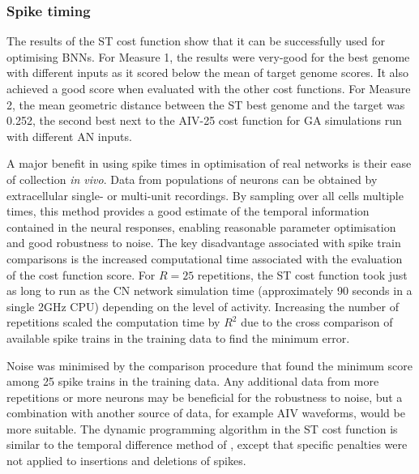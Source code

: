 \subsubsection{Spike timing}\label{sec:GA:spike-timing-summ}

The results of the ST cost function show that it can be successfully used for
optimising BNNs.  For Measure 1, the results were very-good for the best genome
with different inputs as it scored below the mean of target genome scores. It
also achieved a good score when evaluated with the other cost functions.  For
Measure 2, the mean geometric distance between the ST best genome and the target
was 0.252, the second best next to the AIV-25 cost function for GA simulations
run with different AN inputs.

\medskip{}

A major benefit in using spike times in optimisation of real networks is their
ease of collection \textit{in vivo}. Data from populations of neurons can be
obtained by extracellular single- or multi-unit recordings.  By sampling over
all cells multiple times, this method provides a good estimate of the temporal
information contained in the neural responses, enabling reasonable parameter
optimisation and good robustness to noise.  The key disadvantage associated with
spike train comparisons is the increased computational time associated with the
evaluation of the cost function score.  For $R=25$ repetitions, the ST cost
function took just as long to run as the CN network simulation time
(approximately 90 seconds in a single 2GHz CPU) depending on the level of
activity. Increasing the number of repetitions scaled the computation time by
$R^2$ due to the cross comparison of available spike trains in the training data
to find the minimum error.

\medskip{}

Noise was minimised by the comparison procedure that found the minimum score
among 25 spike trains in the training data. Any additional data from more
repetitions or more neurons may be beneficial for the robustness to noise, but a
combination with another source of data, for example AIV waveforms, would be
more suitable. The dynamic programming algorithm in the ST cost function is
similar to the temporal difference method of \citet{VictorGoldbergEtAl:2007},
except that specific penalties were not applied to insertions and deletions of
spikes.


